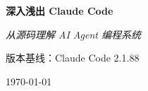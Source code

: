 \clearpage
\thispagestyle{empty}

\begin{center}
  \vspace*{4cm}

  {\Huge\bfseries 深入浅出 Claude Code\par}

  \vspace{1.2cm}

  {\Large\itshape 从源码理解 AI Agent 编程系统\par}

  \vspace{2cm}

  {\normalsize 版本基线：Claude Code 2.1.88\par}

  \vfill

  {\small\today\par}
\end{center}

\clearpage
